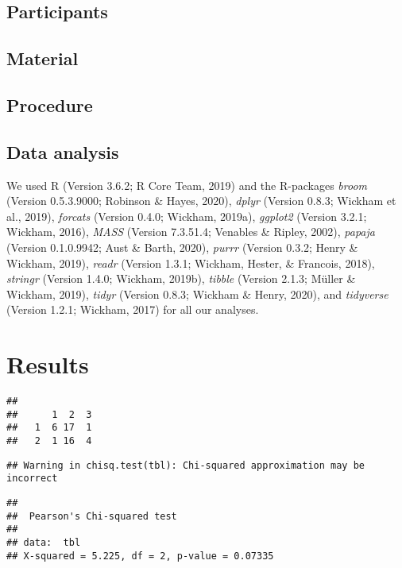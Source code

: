 \documentclass[
  english,
  man]{apa6}
\begin{document}
\hypertarget{participants}{%
\subsection{Participants}\label{participants}}

\hypertarget{material}{%
\subsection{Material}\label{material}}

\hypertarget{procedure}{%
\subsection{Procedure}\label{procedure}}

\hypertarget{data-analysis}{%
\subsection{Data analysis}\label{data-analysis}}


We used R (Version 3.6.2; R Core Team, 2019) and the R-packages \emph{broom} (Version 0.5.3.9000; Robinson \& Hayes, 2020), \emph{dplyr} (Version 0.8.3; Wickham et al., 2019), \emph{forcats} (Version 0.4.0; Wickham, 2019a), \emph{ggplot2} (Version 3.2.1; Wickham, 2016), \emph{MASS} (Version 7.3.51.4; Venables \& Ripley, 2002), \emph{papaja} (Version 0.1.0.9942; Aust \& Barth, 2020), \emph{purrr} (Version 0.3.2; Henry \& Wickham, 2019), \emph{readr} (Version 1.3.1; Wickham, Hester, \& Francois, 2018), \emph{stringr} (Version 1.4.0; Wickham, 2019b), \emph{tibble} (Version 2.1.3; Müller \& Wickham, 2019), \emph{tidyr} (Version 0.8.3; Wickham \& Henry, 2020), and \emph{tidyverse} (Version 1.2.1; Wickham, 2017) for all our analyses.


\hypertarget{results}{%
\section{Results}\label{results}}

\begin{verbatim}
##    
##      1  2  3
##   1  6 17  1
##   2  1 16  4
\end{verbatim}

\begin{verbatim}
## Warning in chisq.test(tbl): Chi-squared approximation may be incorrect
\end{verbatim}

\begin{verbatim}
## 
##  Pearson's Chi-squared test
## 
## data:  tbl
## X-squared = 5.225, df = 2, p-value = 0.07335
\end{verbatim}
\end{document}
